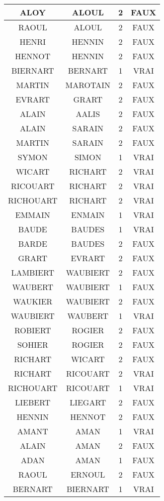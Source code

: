 \begin{center}
\begin{longtable}{|c|c|c|c|}
\hline	ALOY	&	ALOUL	&	2	&	FAUX	\\
\hline	RAOUL	&	ALOUL	&	2	&	FAUX	\\
\hline	HENRI	&	HENNIN	&	2	&	FAUX	\\
\hline	HENNOT	&	HENNIN	&	2	&	FAUX	\\
\hline	BIERNART	&	BERNART	&	1	&	VRAI	\\
\hline	MARTIN	&	MAROTAIN	&	2	&	FAUX	\\
\hline	EVRART	&	GRART	&	2	&	FAUX	\\
\hline	ALAIN	&	AALIS	&	2	&	FAUX	\\
\hline	ALAIN	&	SARAIN	&	2	&	FAUX	\\
\hline	MARTIN	&	SARAIN	&	2	&	FAUX	\\
\hline	SYMON	&	SIMON	&	1	&	VRAI	\\
\hline	WICART	&	RICHART	&	2	&	VRAI	\\
\hline	RICOUART	&	RICHART	&	2	&	VRAI	\\
\hline	RICHOUART	&	RICHART	&	2	&	VRAI	\\
\hline	EMMAIN	&	ENMAIN	&	1	&	VRAI	\\
\hline	BAUDE	&	BAUDES	&	1	&	VRAI	\\
\hline	BARDE	&	BAUDES	&	2	&	FAUX	\\
\hline	GRART	&	EVRART	&	2	&	FAUX	\\
\hline	LAMBIERT	&	WAUBIERT	&	2	&	FAUX	\\
\hline	WAUBERT	&	WAUBIERT	&	1	&	FAUX	\\
\hline	WAUKIER	&	WAUBIERT	&	2	&	FAUX	\\
\hline	WAUBIERT	&	WAUBERT	&	1	&	VRAI	\\
\hline	ROBIERT	&	ROGIER	&	2	&	FAUX	\\
\hline	SOHIER	&	ROGIER	&	2	&	FAUX	\\
\hline	RICHART	&	WICART	&	2	&	FAUX	\\
\hline	RICHART	&	RICOUART	&	2	&	VRAI	\\
\hline	RICHOUART	&	RICOUART	&	1	&	VRAI	\\
\hline	LIEBERT	&	LIEGART	&	2	&	FAUX	\\
\hline	HENNIN	&	HENNOT	&	2	&	FAUX	\\
\hline	AMANT	&	AMAN	&	1	&	VRAI	\\
\hline	ALAIN	&	AMAN	&	2	&	FAUX	\\
\hline	ADAN	&	AMAN	&	1	&	FAUX	\\
\hline	RAOUL	&	ERNOUL	&	2	&	FAUX	\\
\hline	BERNART	&	BIERNART	&	1	&	VRAI	\\

\end{longtable}
\end{center}
